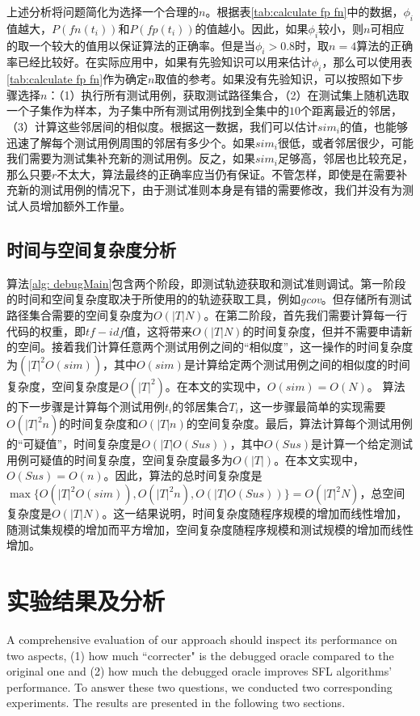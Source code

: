 上述分析将问题简化为选择一个合理的$n$。根据表\ref{tab:calculate fp fn}中的数据，$\phi_i$值越大，$P(fn(t_i))$和$P(fp(t_i))$的值越小。因此，如果$\phi_i$较小，则$n$可相应的取一个较大的值用以保证算法的正确率。但是当$\phi_i > 0.8$时，取$n = 4$算法的正确率已经比较好。在实际应用中，如果有先验知识可以用来估计$\phi_i$，那么可以使用表\ref{tab:calculate fp fn}作为确定$n$取值的参考。如果没有先验知识，可以按照如下步骤选择$n$：（1）执行所有测试用例，获取测试路径集合，（2）在测试集上随机选取一个子集作为样本，为子集中所有测试用例找到全集中的$10$个距离最近的邻居，（3）计算这些邻居间的相似度。根据这一数据，我们可以估计$sim_i$的值，也能够迅速了解每个测试用例周围的邻居有多少个。如果$sim_i$很低，或者邻居很少，可能我们需要为测试集补充新的测试用例。反之，如果$sim_i$足够高，邻居也比较充足，那么只要$r$不太大，算法最终的正确率应当仍有保证。不管怎样，即使是在需要补充新的测试用例的情况下，由于测试准则本身是有错的需要修改，我们并没有为测试人员增加额外工作量。

\subsection{时间与空间复杂度分析}

算法\ref{alg: debugMain}包含两个阶段，即测试轨迹获取和测试准则调试。第一阶段的时间和空间复杂度取决于所使用的的轨迹获取工具，例如\textit{gcov}。但存储所有测试路径集合需要的空间复杂度为$O(|T|N)$。在第二阶段，首先我们需要计算每一行代码的权重，即$tf-idf$值，这将带来$O(|T|N)$的时间复杂度，但并不需要申请新的空间。接着我们计算任意两个测试用例之间的“相似度”，这一操作的时间复杂度为$({|T|}^2 O(sim))$，其中$O(sim)$是计算给定两个测试用例之间的相似度的时间复杂度，空间复杂度是$O({|T|}^2)$。在本文的实现中，$O(sim) = O(N)$。
算法的下一步骤是计算每个测试用例$t_i$的邻居集合$T_i$，这一步骤最简单的实现需要$O({|T|}^2 n)$的时间复杂度和$O(|T| n)$的空间复杂度。最后，算法计算每个测试用例的“可疑值”，时间复杂度是$O(|T| O(Sus))$，其中$O(Sus)$是计算一个给定测试用例可疑值的时间复杂度，空间复杂度最多为$O(|T|)$。在本文实现中，$O(Sus) = O(n)$。因此，算法的总时间复杂度是$\max\{O({|T|}^2 O(sim)), O({|T|}^2 n), O(|T| O(Sus))\} = O({|T|}^2 N)$，总空间复杂度是$O(|T| N)$。这一结果说明，时间复杂度随程序规模的增加而线性增加，随测试集规模的增加而平方增加，空间复杂度随程序规模和测试规模的增加而线性增加。

\section{实验结果及分析}
\label{sec: experiments}
A comprehensive evaluation of our approach should inspect its performance on two aspects, (1) how much ``correcter" is the debugged oracle compared to the original one and (2) how much the debugged oracle improves SFL algorithms' performance. To answer these two questions, we conducted two corresponding experiments. The results are presented in the following two sections.

